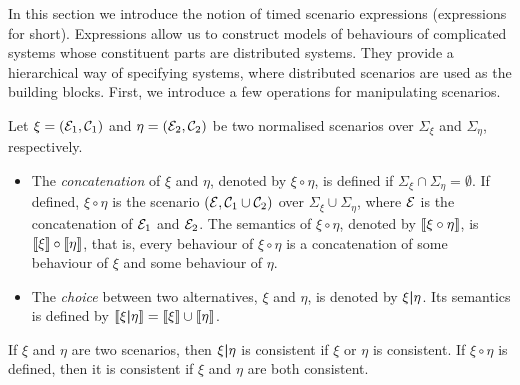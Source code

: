 In this section we introduce the notion of timed scenario expressions
(expressions for short). Expressions allow us to construct models of
behaviours of complicated systems whose constituent parts are
distributed
systems. They provide a hierarchical way of specifying systems, where
distributed scenarios are used as the building blocks.
First, we introduce a few operations for manipulating scenarios.
\begin{definition}
  \label{def-comp-par-seq}
Let $\xi=(\mathcal{E}_1,\mathcal{C}_1)$ and $\eta=(\mathcal{E}_2,\mathcal{C}_2)$ be two normalised scenarios
over $\Sigma_\xi$ and $\Sigma_\eta$, respectively.
\begin{itemize}[noitemsep]
  \item
The \emph{concatenation} of
$\xi$ and $\eta$, denoted by $\xi\circ\eta$, is
defined if $\Sigma_\xi\cap\Sigma_\eta=\emptyset$.
If defined, $\xi\circ\eta$ is the scenario
$(\mathcal{E},\mathcal{C}_1\cup\mathcal{C}_2)$ over $\Sigma_\xi\cup\Sigma_\eta$, where $\mathcal{E}$ is
the concatenation of $\mathcal{E}_1$ and $\mathcal{E}_2$.
The semantics of $\xi\circ\eta$, denoted by $\llbracket \xi\circ\eta \rrbracket$, is
$\llbracket \xi \rrbracket\circ\llbracket \eta \rrbracket$, that is, every behaviour of $\xi \circ \eta$
is a concatenation of some behaviour of $\xi$ and some behaviour of
$\eta$.
\item
   The \emph{choice} between two alternatives, $\xi$ and $\eta$, is denoted by
   $\xi\boldsymbol{|}\eta$.
   Its semantics is defined by $\llbracket \xi\boldsymbol{|}\eta \rrbracket = \llbracket \xi \rrbracket\cup\llbracket \eta \rrbracket$.
\end{itemize}
\end{definition}
\noindent
If $\xi$ and $\eta$ are two scenarios, then
$\xi\boldsymbol{|}\eta$ is consistent if $\xi$ or $\eta$ is consistent.
If $\xi\circ\eta$ is defined, then it is consistent
if $\xi$ and $\eta$ are both consistent.



